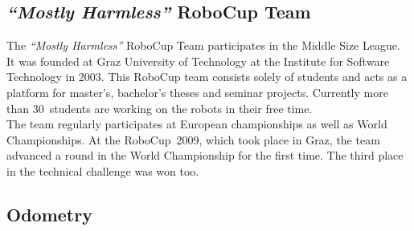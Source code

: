 \documentclass[12pt,a4paper]{article}
\newcommand{\MH}{\emph{``Mostly Harmless''} RoboCup Team\xspace}
\newcommand{\MSL}{Middle Size League\xspace}
\begin{document}

\subsection{\MH}

The \MH participates in the \MSL. 
It was founded at Graz University of Technology at the Institute for Software Technology in 2003. 
This RoboCup team consists solely of students and acts as a platform for master's, bachelor's theses and seminar projects.
Currently more than 30~students are working on the robots in their free time.\\
The team regularly participates at European championships as well as World Championships.
At the RoboCup~2009, which took place in Graz, the team advanced a round in the World Championship for the first time.
The third place in the technical challenge was won too.



\subsection{Odometry}

\end{document}
